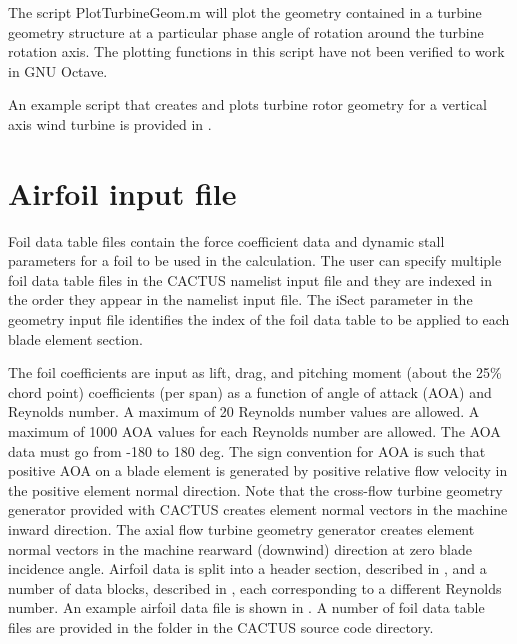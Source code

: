 The script PlotTurbineGeom.m will plot the geometry contained in a turbine geometry structure at a particular phase angle of rotation around the turbine rotation axis. The plotting functions in this script have not been verified to work in GNU Octave.

An example script that creates and plots turbine rotor geometry for a vertical axis wind turbine is provided in .

\section{Airfoil input file}
Foil data table files contain the force coefficient data and dynamic stall parameters for a foil to be used in the calculation. The user can specify multiple foil data table files in the CACTUS namelist input file and they are indexed in the order they appear in the namelist input file. The iSect parameter in the geometry input file identifies the index of the foil data table to be applied to each blade element section.

The foil coefficients are input as lift, drag, and pitching moment (about the 25\% chord point) coefficients (per span) as a function of angle of attack (AOA) and Reynolds number. A maximum of 20 Reynolds number values are allowed. A maximum of 1000 AOA values for each Reynolds number are allowed. The AOA data must go from -180 to 180 deg. The sign convention for AOA is such that positive AOA on a blade element is generated by positive relative flow velocity in the positive element normal direction. Note that the cross-flow turbine geometry generator provided with CACTUS creates element normal vectors in the machine inward direction. The axial flow turbine geometry generator creates element normal vectors in the machine rearward (downwind) direction at zero blade incidence angle. 
Airfoil data is split into a header section, described in , and a number of data blocks, described in , each corresponding to a different Reynolds number. An example airfoil data file is shown in . A number of foil data table files are provided in the  folder in the CACTUS source code directory.


